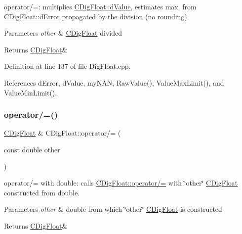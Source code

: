 operator/=\+: multiplies \hyperlink{classCDigFloat_a4bbe69e30dd4e20527362493aa9aaf96}{C\+Dig\+Float\+::d\+Value}, estimates max. from \hyperlink{classCDigFloat_a25eb3782d1e727ff007a48f8308e3d4d}{C\+Dig\+Float\+::d\+Error} propagated by the division (no rounding) 


\begin{DoxyParams}{Parameters}
{\em other} & \hyperlink{classCDigFloat}{C\+Dig\+Float} divided \\
\hline
\end{DoxyParams}
\begin{DoxyReturn}{Returns}
\hyperlink{classCDigFloat}{C\+Dig\+Float}\& 
\end{DoxyReturn}


Definition at line 137 of file Dig\+Float.\+cpp.



References d\+Error, d\+Value, my\+N\+AN, Raw\+Value(), Value\+Max\+Limit(), and Value\+Min\+Limit().

\mbox{\label{classCDigFloat_ab6531a2016f5cc631cc92719ffc06385}} 
\subsubsection{\texorpdfstring{operator/=()}{operator/=()}\hspace{0.1cm}{\footnotesize\ttfamily [2/2]}}
{\footnotesize\ttfamily \hyperlink{classCDigFloat}{C\+Dig\+Float} \& C\+Dig\+Float\+::operator/= (\begin{DoxyParamCaption}\item[{const double}]{other }\end{DoxyParamCaption})}



operator/= with double\+: calls \hyperlink{classCDigFloat_a53d3939dfc89d172f1bf803a46bc3369}{C\+Dig\+Float\+::operator/=} with \char`\"{}other\char`\"{} \hyperlink{classCDigFloat}{C\+Dig\+Float} constructed from double. 


\begin{DoxyParams}{Parameters}
{\em other} & double from which \char`\"{}other\char`\"{} \hyperlink{classCDigFloat}{C\+Dig\+Float} is constructed \\
\hline
\end{DoxyParams}
\begin{DoxyReturn}{Returns}
\hyperlink{classCDigFloat}{C\+Dig\+Float}\& 
\end{DoxyReturn}


